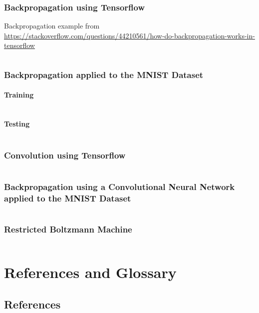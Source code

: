 \documentclass[a4paper,twoside,10pt]{article}
\begin{document}
\subsubsection{Backpropagation using Tensorflow}\label{app:backprop}
Backpropagation example from \url{https://stackoverflow.com/questions/44210561/how-do-backpropagation-works-in-tensorflow}
\inputminted[frame=lines,linenos,fontsize=\small]{python}{backprop.py}

\subsubsection{Backpropagation applied to the MNIST Dataset}\label{app:mnistbackprop}
\paragraph{Training}
\inputminted[frame=lines,linenos,fontsize=\small]{python}{mnist-backprop.py}
\paragraph{Testing}
\inputminted[frame=lines,linenos,fontsize=\small]{python}{mnist-run.py}

\subsubsection{Convolution using Tensorflow}\label{app:convolution}
\inputminted[frame=lines,linenos,fontsize=\small]{python}{convolution.py}

\subsubsection{Backpropagation using a Convolutional Neural Network applied to the MNIST Dataset}\label{app:mnistcnn}
\inputminted[frame=lines,linenos,fontsize=\small]{python}{mnist-convolutional.py}

\subsubsection{Restricted Boltzmann Machine}\label{app:rbm}
\inputminted[frame=lines,linenos,fontsize=\small]{python}{mnist-rbm.py}

\section{References and Glossary}
\subsection{References}
\printbibliography[heading=none]
\end{document}
